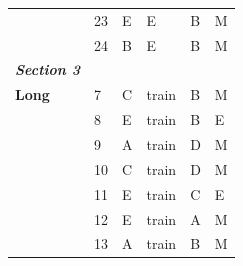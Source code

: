 \documentclass[pageno]{jpaper}
\newcommand{\textbi}[1]{\textbf{\textit{#1}}}
\begin{document}
\begin{table}[]
\begin{tabular}{llllll}
\textbf{}                & 23                                  & E                                          & E                                           & B                                           & M                                       \\
\textbf{}                & 24                                  & B                                          & E                                           & B                                           & M                                       \\ \midrule
\textbi{Section 3}       &                                     &                                            &                                             &                                             &                                         \\ \midrule
\textbf{Long}            & 7                                   & C                                          & train                                       & B                                           & M                                       \\
\textbf{}                & 8                                   & E                                          & train                                       & B                                           & E                                       \\
\textbf{}                & 9                                   & A                                          & train                                       & D                                           & M                                       \\
\textbf{}                & 10                                  & C                                          & train                                       & D                                           & M                                       \\
\textbf{}                & 11                                  & E                                          & train                                       & C                                           & E                                       \\
\textbf{}                & 12                                  & E                                          & train                                       & A                                           & M                                       \\
\textbf{}                & 13                                  & A                                          & train                                       & B                                           & M                                       \\

\end{tabular}
\end{table}
\end{document}
